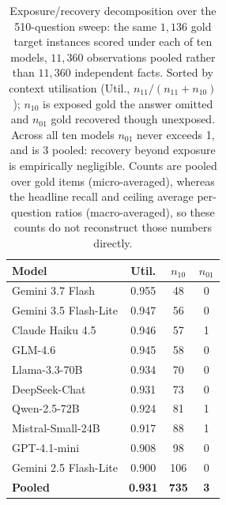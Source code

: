 \documentclass[10pt,twocolumn]{article}
\begin{document}
\begin{table}[tb]\centering\footnotesize
\caption{Exposure/recovery decomposition over the 510-question sweep: the same $1{,}136$ gold target
instances scored under each of ten models, $11{,}360$ observations pooled rather than $11{,}360$ independent
facts. Sorted by context utilisation (Util., $n_{11}/(n_{11}+n_{10})$); $n_{10}$ is exposed gold the answer omitted and $n_{01}$ gold recovered though unexposed. Across all ten models $n_{01}$ never exceeds 1, and is 3 pooled: recovery beyond exposure is
empirically negligible. Counts are pooled over
gold items (micro-averaged), whereas the headline recall and ceiling average per-question ratios
(macro-averaged), so these counts do not reconstruct those numbers directly.}
\label{tab:decomp}
\begin{tabular}{lccc}
\toprule
Model & Util. & $n_{10}$ & $n_{01}$ \\
\midrule
Gemini 3.7 Flash      & 0.955 & 48  & 0 \\
Gemini 3.5 Flash-Lite & 0.947 & 56  & 0 \\
Claude Haiku 4.5      & 0.946 & 57  & 1 \\
GLM-4.6               & 0.945 & 58  & 0 \\
Llama-3.3-70B         & 0.934 & 70  & 0 \\
DeepSeek-Chat         & 0.931 & 73  & 0 \\
Qwen-2.5-72B          & 0.924 & 81  & 1 \\
Mistral-Small-24B     & 0.917 & 88  & 1 \\
GPT-4.1-mini          & 0.908 & 98  & 0 \\
Gemini 2.5 Flash-Lite & 0.900 & 106 & 0 \\
\midrule
\textbf{Pooled}       & \textbf{0.931} & \textbf{735} & \textbf{3} \\
\bottomrule
\end{tabular}
\end{table}
\end{document}
